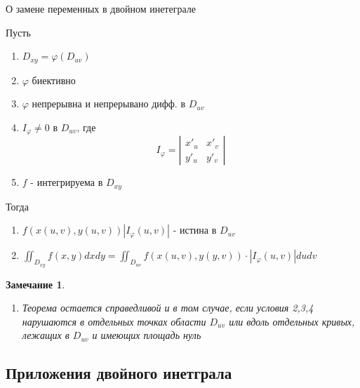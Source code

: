 \documentclass[a4paper, 14pt]{report}
\newtheorem{note}{Замечание}[section]
\begin{document}
\begin{theorem}
    О замене переменных в двойном инетеграле

    Пусть

    \begin{enumerate}
        \item $D_{xy} = \varphi(D_{uv})$
        \item $\varphi$ биективно
        \item $\varphi$ непрерывна и непрерывано дифф. в $D_{uv}$
        \item $I_\varphi \ne 0$ в $D_{uv}$, где 
            $$
                I_\varphi = \left| \begin{matrix} x'_u & x'_v \\ y'_u & y'_v \end{matrix} \right|
            $$
        \item $f$ - интегрируема в $D_{xy}$
    \end{enumerate}
    
    Тогда

    \begin{enumerate}
        \item $f(x(u,v), y(u,v)) |I_\varphi (u,v)|$ - истина в $D_{uv}$
        \item $\iint_{D_{xy}} f(x,y) dxdy = \iint_{D_{uv}} f(x(u,v), y(y,v)) \cdot |I_\varphi (u,v)| dudv$
    \end{enumerate}
\end{theorem}

\begin{note}
    \begin{enumerate}
        \item Теорема остается справедливой и в том случае, если условия 2,3,4 нарушаются в отдельных точках области $D_{uv}$ или вдоль отдельных кривых, лежащих в $D_{uv}$ и имеющих площадь нуль
    \end{enumerate}
\end{note}

\subsection{Приложения двойного инетграла}
\end{document}
